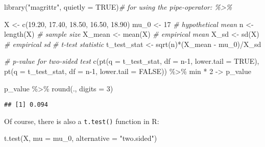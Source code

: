 \documentclass[
]{book}
\newenvironment{Shaded}{\begin{snugshade}}{\end{snugshade}}
\newcommand{\AttributeTok}[1]{\textcolor[rgb]{0.77,0.63,0.00}{#1}}
\newcommand{\CommentTok}[1]{\textcolor[rgb]{0.56,0.35,0.01}{\textit{#1}}}
\newcommand{\ConstantTok}[1]{\textcolor[rgb]{0.00,0.00,0.00}{#1}}
\newcommand{\DecValTok}[1]{\textcolor[rgb]{0.00,0.00,0.81}{#1}}
\newcommand{\FloatTok}[1]{\textcolor[rgb]{0.00,0.00,0.81}{#1}}
\newcommand{\FunctionTok}[1]{\textcolor[rgb]{0.00,0.00,0.00}{#1}}
\newcommand{\NormalTok}[1]{#1}
\newcommand{\OtherTok}[1]{\textcolor[rgb]{0.56,0.35,0.01}{#1}}
\newcommand{\SpecialCharTok}[1]{\textcolor[rgb]{0.00,0.00,0.00}{#1}}
\newcommand{\StringTok}[1]{\textcolor[rgb]{0.31,0.60,0.02}{#1}}
\begin{document}
\begin{Shaded}
\begin{Highlighting}[]
\FunctionTok{library}\NormalTok{(}\StringTok{"magrittr"}\NormalTok{, }\AttributeTok{quietly =} \ConstantTok{TRUE}\NormalTok{)}\CommentTok{\# for using the pipe{-}operator: \%\textgreater{}\% }

\NormalTok{X           }\OtherTok{\textless{}{-}} \FunctionTok{c}\NormalTok{(}\FloatTok{19.20}\NormalTok{, }\FloatTok{17.40}\NormalTok{, }\FloatTok{18.50}\NormalTok{, }\FloatTok{16.50}\NormalTok{, }\FloatTok{18.90}\NormalTok{)}
\NormalTok{mu\_0        }\OtherTok{\textless{}{-}} \DecValTok{17}        \CommentTok{\# hypothetical mean}
\NormalTok{n           }\OtherTok{\textless{}{-}} \FunctionTok{length}\NormalTok{(X) }\CommentTok{\# sample size}
\NormalTok{X\_mean      }\OtherTok{\textless{}{-}} \FunctionTok{mean}\NormalTok{(X)   }\CommentTok{\# empirical mean}
\NormalTok{X\_sd        }\OtherTok{\textless{}{-}} \FunctionTok{sd}\NormalTok{(X)     }\CommentTok{\# empirical sd}
\CommentTok{\# t{-}test statistic}
\NormalTok{t\_test\_stat }\OtherTok{\textless{}{-}} \FunctionTok{sqrt}\NormalTok{(n)}\SpecialCharTok{*}\NormalTok{(X\_mean }\SpecialCharTok{{-}}\NormalTok{ mu\_0)}\SpecialCharTok{/}\NormalTok{X\_sd}

\CommentTok{\# p{-}value for two{-}sided test}
\FunctionTok{c}\NormalTok{(}\FunctionTok{pt}\NormalTok{(}\AttributeTok{q =}\NormalTok{ t\_test\_stat, }\AttributeTok{df =}\NormalTok{ n}\DecValTok{{-}1}\NormalTok{, }\AttributeTok{lower.tail =} \ConstantTok{TRUE}\NormalTok{), }
  \FunctionTok{pt}\NormalTok{(}\AttributeTok{q =}\NormalTok{ t\_test\_stat, }\AttributeTok{df =}\NormalTok{ n}\DecValTok{{-}1}\NormalTok{, }\AttributeTok{lower.tail =} \ConstantTok{FALSE}\NormalTok{)) }\SpecialCharTok{\%\textgreater{}\%} 
\NormalTok{  min }\SpecialCharTok{*} \DecValTok{2} \OtherTok{{-}\textgreater{}}\NormalTok{ p\_value}
      
\NormalTok{p\_value }\SpecialCharTok{\%\textgreater{}\%} \FunctionTok{round}\NormalTok{(., }\AttributeTok{digits =} \DecValTok{3}\NormalTok{)}
\end{Highlighting}
\end{Shaded}

\begin{verbatim}
## [1] 0.094
\end{verbatim}

Of course, there is also a \texttt{t.test()} function in R:

\begin{Shaded}
\begin{Highlighting}[]
\FunctionTok{t.test}\NormalTok{(X, }\AttributeTok{mu =}\NormalTok{ mu\_0, }\AttributeTok{alternative =} \StringTok{"two.sided"}\NormalTok{)}
\end{Highlighting}
\end{Shaded}
\end{document}
